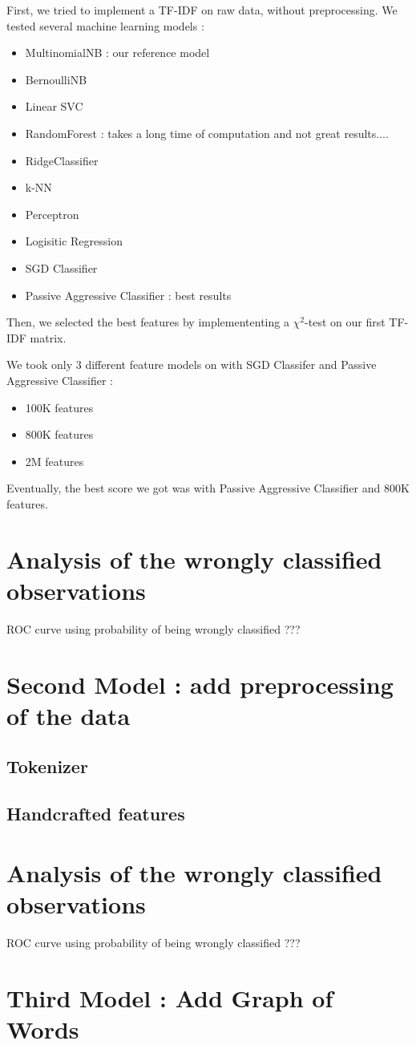 \documentclass{report}
\begin{document}
First, we tried to implement a TF-IDF on raw data, without preprocessing.
We tested several machine learning models :
\begin{itemize}
	\item MultinomialNB : our reference model
	\item BernoulliNB
	\item Linear SVC
	\item RandomForest : takes a long time of computation and not great results....
	\item RidgeClassifier
	\item k-NN
	\item Perceptron
	\item Logisitic Regression
	\item SGD Classifier
	\item Passive Aggressive Classifier : best results 
\end{itemize} 

Then, we selected the best features by implemententing a $\chi^2$-test on our first TF-IDF matrix.

We took only 3 different feature models on with SGD Classifer and Passive Aggressive Classifier :
\begin{itemize}
	\item 100K features
	\item 800K features
	\item 2M features
\end{itemize} 

Eventually, the best score we got was with Passive Aggressive Classifier and 800K features.

\section{Analysis of the wrongly classified observations}

ROC curve using probability of being wrongly classified ???

\section{Second Model : add preprocessing of the data}

\subsection{Tokenizer}

\subsection{Handcrafted features}

\section{Analysis of the wrongly classified observations}

ROC curve using probability of being wrongly classified ???

\section{Third Model : Add Graph of Words}
\end{document}
